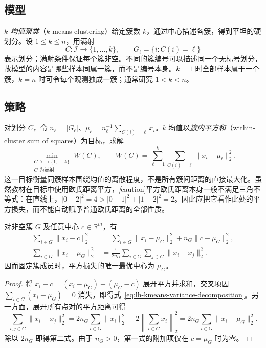 \subsection{模型}
\label{subsec:lh-kmeans-model}

\emph{$k$ 均值聚类}（$k$-means clustering）给定簇数 $k$，通过中心描述各簇，得到平坦的硬划分。设 $1\leq k\leq n$，用满射
\begin{equation}
C:\mathcal I\longrightarrow\{1,\ldots,k\},\qquad G_\ell=\{i:C(i)=\ell\}
\label{eq:lh-kmeans-assignment}
\end{equation}
表示划分；满射条件保证每个簇非空。不同的簇编号可以描述同一个无标号划分，故模型的内容是哪些样本同属一簇，而不是编号本身。$k=1$ 时全部样本属于一个簇，$k=n$ 时可令每个观测独成一簇；通常研究 $1<k<n$。

\subsection{策略}
\label{subsec:lh-kmeans-objective}

对划分 $C$，令 $n_\ell=|G_\ell|$、$\mu_\ell=n_\ell^{-1}\sum_{C(i)=\ell}x_i$。$k$ 均值以\emph{簇内平方和}（within-cluster sum of squares）为目标，求解
\begin{equation}
\min_{\substack{C:\mathcal I\to\{1,\ldots,k\}\\C\text{ 为满射}}}
W(C),\qquad
W(C)=\sum_{\ell=1}^k\sum_{C(i)=\ell}\|x_i-\mu_\ell\|_2^2.
\label{eq:lh-kmeans-wcss}
\end{equation}
这一目标衡量同簇样本围绕均值的离散程度，不是所有簇间距离的直接最大化。虽然教材在目标中使用欧氏距离平方，\emph[caution]{平方欧氏距离本身一般不满足三角不等式}：在直线上，$|0-2|^2=4>|0-1|^2+|1-2|^2=2$。因此应把它看作此处的平方损失，而不能自动赋予普通欧氏距离的全部性质。

\begin{proposition}[均值的最优性与成对距离表示]
\label{prop:lh-kmeans-centroid-optimum}
对非空簇 $G$ 及任意中心 $c\in\mathbb R^m$，有
\begin{align}
\sum_{i\in G}\|x_i-c\|_2^2
&=\sum_{i\in G}\|x_i-\mu_G\|_2^2+n_G\|c-\mu_G\|_2^2,
\label{eq:lh-kmeans-variance-decomposition}\\
\sum_{i\in G}\|x_i-\mu_G\|_2^2
&=\frac1{2n_G}\sum_{i\in G}\sum_{j\in G}\|x_i-x_j\|_2^2.
\label{eq:lh-kmeans-pairwise}
\end{align}
因而固定簇成员时，平方损失的唯一最优中心为 $\mu_G$。
\end{proposition}
\begin{proof}
将 $x_i-c=(x_i-\mu_G)+(\mu_G-c)$ 展开平方并求和，交叉项因 $\sum_{i\in G}(x_i-\mu_G)=0$ 消失，即得式~\eqref{eq:lh-kmeans-variance-decomposition}。另一方面，展开所有点对的平方距离可得
\[
\sum_{i,j\in G}\|x_i-x_j\|_2^2
=2n_G\sum_{i\in G}\|x_i\|_2^2-2\left\|\sum_{i\in G}x_i\right\|_2^2
=2n_G\sum_{i\in G}\|x_i-\mu_G\|_2^2.
\]
除以 $2n_G$ 即得第二式。由于 $n_G>0$，第一式的附加项仅在 $c=\mu_G$ 时为零。
\end{proof}

